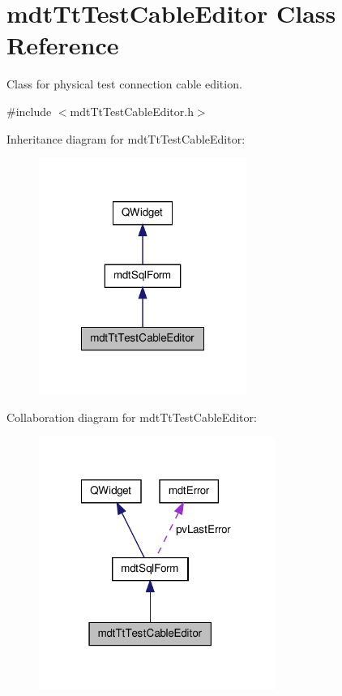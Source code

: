 \hypertarget{classmdt_tt_test_cable_editor}{\section{mdt\-Tt\-Test\-Cable\-Editor Class Reference}
\label{classmdt_tt_test_cable_editor}
}


Class for physical test connection cable edition.  




{\ttfamily \#include $<$mdt\-Tt\-Test\-Cable\-Editor.\-h$>$}



Inheritance diagram for mdt\-Tt\-Test\-Cable\-Editor\-:\nopagebreak
\begin{figure}[H]
\begin{center}
\leavevmode
\includegraphics[width=192pt]{classmdt_tt_test_cable_editor__inherit__graph}
\end{center}
\end{figure}


Collaboration diagram for mdt\-Tt\-Test\-Cable\-Editor\-:\nopagebreak
\begin{figure}[H]
\begin{center}
\leavevmode
\includegraphics[width=218pt]{classmdt_tt_test_cable_editor__coll__graph}
\end{center}
\end{figure}
